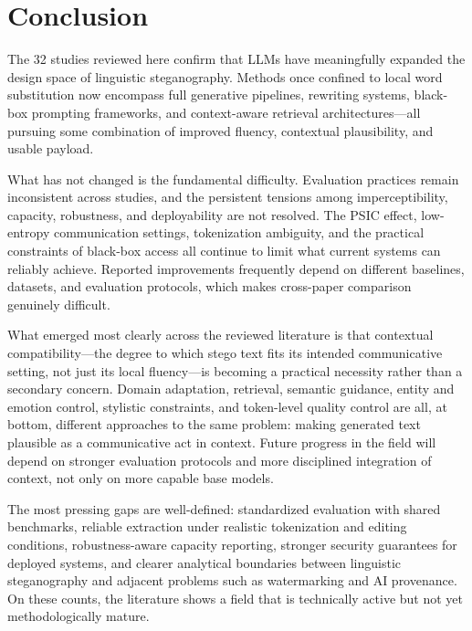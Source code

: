 \section{Conclusion}

The 32 studies reviewed here confirm that LLMs have meaningfully expanded the design space of linguistic steganography. Methods once confined to local word substitution now encompass full generative pipelines, rewriting systems, black-box prompting frameworks, and context-aware retrieval architectures---all pursuing some combination of improved fluency, contextual plausibility, and usable payload.

What has not changed is the fundamental difficulty. Evaluation practices remain inconsistent across studies, and the persistent tensions among imperceptibility, capacity, robustness, and deployability are not resolved. The PSIC effect, low-entropy communication settings, tokenization ambiguity, and the practical constraints of black-box access all continue to limit what current systems can reliably achieve. Reported improvements frequently depend on different baselines, datasets, and evaluation protocols, which makes cross-paper comparison genuinely difficult.

What emerged most clearly across the reviewed literature is that contextual compatibility---the degree to which stego text fits its intended communicative setting, not just its local fluency---is becoming a practical necessity rather than a secondary concern. Domain adaptation, retrieval, semantic guidance, entity and emotion control, stylistic constraints, and token-level quality control are all, at bottom, different approaches to the same problem: making generated text plausible as a communicative act in context. Future progress in the field will depend on stronger evaluation protocols and more disciplined integration of context, not only on more capable base models.

The most pressing gaps are well-defined: standardized evaluation with shared benchmarks, reliable extraction under realistic tokenization and editing conditions, robustness-aware capacity reporting, stronger security guarantees for deployed systems, and clearer analytical boundaries between linguistic steganography and adjacent problems such as watermarking and AI provenance. On these counts, the literature shows a field that is technically active but not yet methodologically mature.

